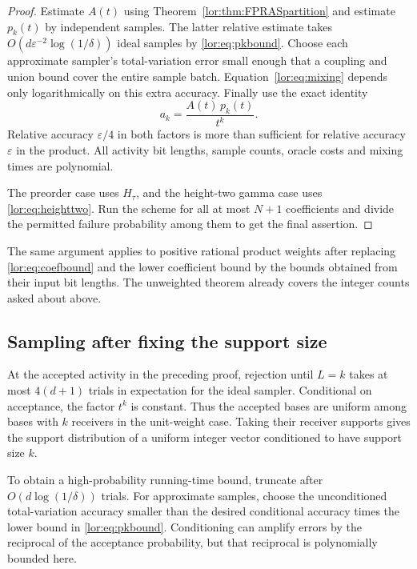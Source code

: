 \documentclass[11pt]{article}
\numberwithin{equation}{section}
\theoremstyle{definition}
\begin{document}
\begin{proof}
Estimate $A(t)$ using Theorem~\ref{lor:thm:FPRASpartition} and estimate $p_k(t)$
by independent samples. The latter relative estimate takes
$O(d\varepsilon^{-2}\log(1/\delta))$ ideal samples by
\eqref{lor:eq:pkbound}. Choose each approximate sampler's total-variation
error small enough that a coupling and union bound cover the entire
sample batch. Equation~\eqref{lor:eq:mixing} depends only logarithmically on
this extra accuracy. Finally use the exact identity
\begin{equation}
 a_k=\frac{A(t)\,p_k(t)}{t^k}.
 \label{lor:eq:coefficientrecovery}
\end{equation}
Relative accuracy $\varepsilon/4$ in both factors is more than sufficient
for relative accuracy $\varepsilon$ in the product. All activity bit
lengths, sample counts, oracle costs and mixing times are polynomial.

The preorder case uses $H_\tau$, and the height-two gamma case uses
\eqref{lor:eq:heighttwo}. Run the scheme for all at most $N+1$ coefficients and
divide the permitted failure probability among them to get the final
assertion.
\end{proof}
The same argument applies to positive rational product weights after
replacing \eqref{lor:eq:coefbound} and the lower coefficient bound by the
bounds obtained from their input bit lengths. The unweighted theorem
already covers the integer counts asked about above.

\subsection{Sampling after fixing the support size}
At the accepted activity in the preceding proof, rejection until $L=k$
takes at most $4(d+1)$ trials in expectation for the ideal sampler.
Conditional on acceptance, the factor $t^k$ is constant. Thus the accepted
bases are uniform among bases with $k$ receivers in the unit-weight case.
Taking their receiver supports gives the support distribution of a uniform
integer vector conditioned to have support size $k$.

To obtain a high-probability running-time bound, truncate after
$O(d\log(1/\delta))$ trials. For approximate samples, choose the
unconditioned total-variation accuracy smaller than the desired
conditional accuracy times the lower bound in \eqref{lor:eq:pkbound}.
Conditioning can amplify errors by the reciprocal of the acceptance
probability, but that reciprocal is polynomially bounded here.
\end{document}

